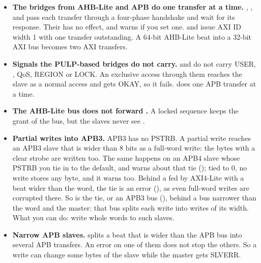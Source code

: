 \begin{itemize}
  So such a write is not atomic at the slave: the slave sees several writes, and another
  master can access the word between them. What you can do: write whole words to AHB-Lite
  registers where this matters. A change to this behaviour is planned.
\item \textbf{The bridges from AHB-Lite and APB do one transfer at a time.}
  , ,  and  pass
  each transfer through a four-phase handshake and wait for its response. Their
   has no effect, and  warns if you set one.
   and  issue AXI ID width 1 with one transfer
  outstanding. A 64-bit AHB-Lite beat into a 32-bit AXI bus becomes two AXI transfers.
\item \textbf{Signals the PULP-based bridges do not carry.}  and
   do not carry USER, , QoS, REGION or LOCK. An exclusive
  access through them reaches the slave as a normal access and gets OKAY, so it fails.
   does one APB transfer at a time.
\item \textbf{The AHB-Lite bus does not forward .} A locked sequence
  keeps the grant of the bus, but the slaves never see .
\item \textbf{Partial writes into APB3.} APB3 has no PSTRB. A partial write reaches an
  APB3 slave that is wider than 8 bits as a full-word write: the bytes with a clear
  strobe are written too. The same happens on an APB4 slave whose PSTRB you tie in
   to the default, and  warns about that tie
  (); tied to 0, no write stores any byte, and it warns too.
  Behind a  fed by AXI4-Lite with a beat wider than the word, the tie is
  an error (), as even full-word writes are corrupted there.
  So is the tie, or an APB3 bus (), behind a bus narrower than the
  word and the master: that bus splits each write into writes of its width.
  What you can do: write whole words to such slaves.
\item \textbf{Narrow APB slaves.}  splits a beat that is wider than
  the APB bus into several APB transfers. An error on one of them does not stop the
  others. So a write can change some bytes of the slave while the master gets SLVERR.


\end{itemize}
